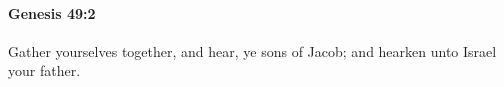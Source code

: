
		\paragraph{Genesis 49:2} %
			\label{GENESIS-49-2}

			Gather yourselves together, and hear, ye sons of Jacob; and hearken unto Israel your father.


